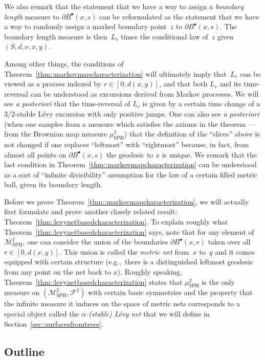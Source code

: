 \documentclass[JEP,XML,SOM,Unicode]{cedram}
\let\mathcal\mathscr
\newcommand{\sbullet}{{\scriptscriptstyle\bullet}}
\theoremstyle{plain}
\numberwithin{theorem}{section}
\theoremstyle{definition}
\newcommand\gmsspace{{\mathcal M}_{\mathrm{SPH}}}
\newcommand\mmsigma{{\mathcal F}}
\newcommand{\mustwo}{\mu_{\mathrm{SPH}}^2}
\newcommand{\fb}[2]{B^\sbullet(#1,#2)}
\begin{document}
We also remark that the statement that we have a way to assign a \emph{boundary length} measure to $\partial \fb{x}{s}$ can be reformulated as the statement that we have a way to randomly assign a marked boundary point~$z$ to $\partial \fb{x}{s}$. The boundary length measure is then~$L_s$ times the conditional law of~$z$ given $(S,d,\nu,x,y)$.\enlargethispage{\baselineskip}%

Among other things, the conditions of Theorem~\ref{thm::markovmapcharacterization} will ultimately imply that~$L_r$ can be viewed as a process indexed by $r \in [0,d(x,y)]$, and that both $L_r$ and its time-reversal can be understood as excursions derived from Markov processes. We will see \emph{a posteriori} that the time-reversal of $L_r$ is given by a certain time change of a $3/2$-stable Lévy excursion with only positive jumps. One can also see \emph{a posteriori} (when one samples from a measure which satisfies the axioms in the theorem --- \ie from the Brownian map measure $\mustwo$) that the definition of the ``slices'' above is not changed if one replaces ``leftmost'' with ``rightmost'' because, in fact, from almost all points on $\partial \fb{x}{s}$ the geodesic to $x$ is unique. We remark that the last condition in Theorem~\ref{thm::markovmapcharacterization} can be understood as a sort of ``infinite divisibility'' assumption for the law of a certain filled metric ball, given its boundary length.

Before we prove Theorem~\ref{thm::markovmapcharacterization}, we will actually first formulate and prove another closely related result: Theorem~\ref{thm::levynetbasedcharacterization}. To explain roughly what Theorem~\ref{thm::levynetbasedcharacterization} says, note that for any element of $\gmsspace^2$, one can consider the union of the boundaries $\partial \fb{x}{r}$ taken over all $r \in [0,d(x,y)]$. This union is called the \emph{metric net} from~$x$ to~$y$ and it comes equipped with certain structure (e.g.,\ there is a distinguished leftmost geodesic from any point on the net back to $x$). Roughly speaking, Theorem~\ref{thm::levynetbasedcharacterization} states that $\mustwo$ is the only measure on $(\gmsspace^2, \mmsigma^2)$ with certain basic symmetries and the property that the infinite measure it induces on the space of metric nets corresponds to a special object called the \emph{$\alpha$-(stable) Lévy net} that we will define in Section~\ref{sec::surfacesfromtrees}.

\subsection{Outline}
\label{subsec::outline}
\end{document}
